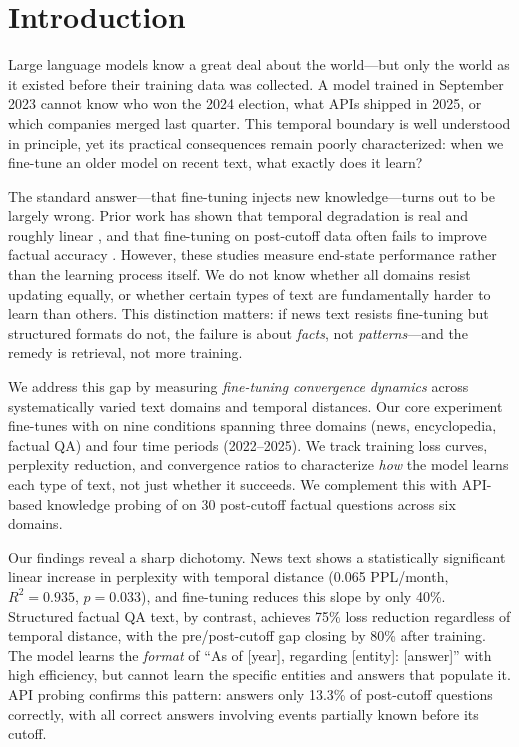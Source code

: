 \section{Introduction}
\label{sec:intro}

Large language models know a great deal about the world---but only the world as it existed before their training data was collected. A model trained in September 2023 cannot know who won the 2024 election, what APIs shipped in 2025, or which companies merged last quarter. This temporal boundary is well understood in principle, yet its practical consequences remain poorly characterized: when we fine-tune an older model on recent text, what exactly does it learn?

The standard answer---that fine-tuning injects new knowledge---turns out to be largely wrong. Prior work has shown that temporal degradation is real and roughly linear \citep{nylund2023time, li2024outdated}, and that fine-tuning on post-cutoff data often fails to improve factual accuracy \citep{ovadia2024finetuning}. However, these studies measure end-state performance rather than the learning process itself. We do not know whether all domains resist updating equally, or whether certain types of text are fundamentally harder to learn than others. This distinction matters: if news text resists fine-tuning but structured formats do not, the failure is about \emph{facts}, not \emph{patterns}---and the remedy is retrieval, not more training.

We address this gap by measuring \emph{fine-tuning convergence dynamics} across systematically varied text domains and temporal distances. Our core experiment fine-tunes \mistral \citep{jiang2023mistral} with \lora \citep{hu2022lora} on nine conditions spanning three domains (news, encyclopedia, factual QA) and four time periods (2022--2025). We track training loss curves, perplexity reduction, and convergence ratios to characterize \emph{how} the model learns each type of text, not just whether it succeeds. We complement this with API-based knowledge probing of \gptthree on 30 post-cutoff factual questions across six domains.

Our findings reveal a sharp dichotomy. News text shows a statistically significant linear increase in perplexity with temporal distance (0.065 PPL/month, $R^2{=}0.935$, $p{=}0.033$), and fine-tuning reduces this slope by only 40\%. Structured factual QA text, by contrast, achieves 75\% loss reduction regardless of temporal distance, with the pre/post-cutoff gap closing by 80\% after training. The model learns the \emph{format} of ``As of [year], regarding [entity]: [answer]'' with high efficiency, but cannot learn the specific entities and answers that populate it. API probing confirms this pattern: \gptthree answers only 13.3\% of post-cutoff questions correctly, with all correct answers involving events partially known before its cutoff.

